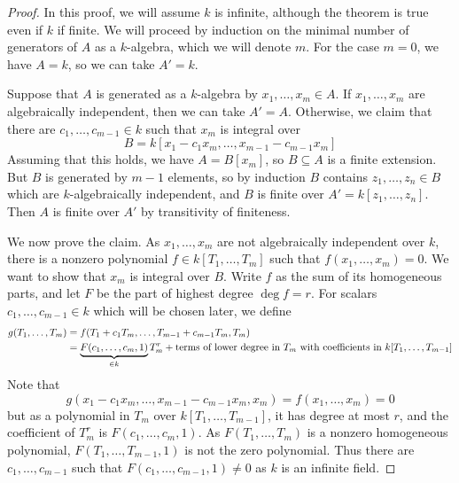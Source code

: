 \begin{proof}
    In this proof, we will assume \( k \) is infinite, although the theorem is true even if \( k \) if finite.
    We will proceed by induction on the minimal number of generators of \( A \) as a \( k \)-algebra, which we will denote \( m \).
    For the case \( m = 0 \), we have \( A = k \), so we can take \( A' = k \).

    Suppose that \( A \) is generated as a \( k \)-algebra by \( x_1, \dots, x_m \in A \).
    If \( x_1, \dots, x_m \) are algebraically independent, then we can take \( A' = A \).
    Otherwise, we claim that there are \( c_1, \dots, c_{m-1} \in k \) such that \( x_m \) is integral over
    \[ B = k[x_1 - c_1 x_m, \dots, x_{m-1} - c_{m-1} x_m] \]
    Assuming that this holds, we have \( A = B[x_m] \), so \( B \subseteq A \) is a finite extension.
    But \( B \) is generated by \( m - 1 \) elements, so by induction \( B \) contains \( z_1, \dots, z_n \in B \) which are \( k \)-algebraically independent, and \( B \) is finite over \( A' = k[z_1, \dots, z_n] \).
    Then \( A \) is finite over \( A' \) by transitivity of finiteness.

    We now prove the claim.
    As \( x_1, \dots, x_m \) are not algebraically independent over \( k \), there is a nonzero polynomial \( f \in k[T_1, \dots, T_m] \) such that \( f(x_1, \dots, x_m) = 0 \).
    We want to show that \( x_m \) is integral over \( B \).
    Write \( f \) as the sum of its homogeneous parts, and let \( F \) be the part of highest degree \( \deg f = r \).
    For scalars \( c_1, \dots, c_{m-1} \in k \) which will be chosen later, we define
    \begin{align*}
        g(T_1, \dots, T_m) &= f(T_1 + c_1 T_m, \dots, T_{m-1} + c_{m-1} T_m, T_m) \\
        &= \underbrace{F(c_1, \dots, c_m, 1)}_{\in k} T_m^r + \text{terms of lower degree in \( T_m \) with coefficients in \( k[T_1, \dots, T_{m-1}] \)}
    \end{align*}
    Note that
    \[ g(x_1 - c_1 x_m, \dots, x_{m-1} - c_{m-1} x_m, x_m) = f(x_1, \dots, x_m) = 0 \]
    but as a polynomial in \( T_m \) over \( k[T_1, \dots, T_{m-1}] \), it has degree at most \( r \), and the coefficient of \( T_m^r \) is \( F(c_1, \dots, c_m, 1) \).
    As \( F(T_1, \dots, T_m) \) is a nonzero homogeneous polynomial, \( F(T_1, \dots, T_{m-1}, 1) \) is not the zero polynomial.
    Thus there are \( c_1, \dots, c_{m-1} \) such that \( F(c_1, \dots, c_{m-1}, 1) \neq 0 \) as \( k \) is an infinite field.
\end{proof}

